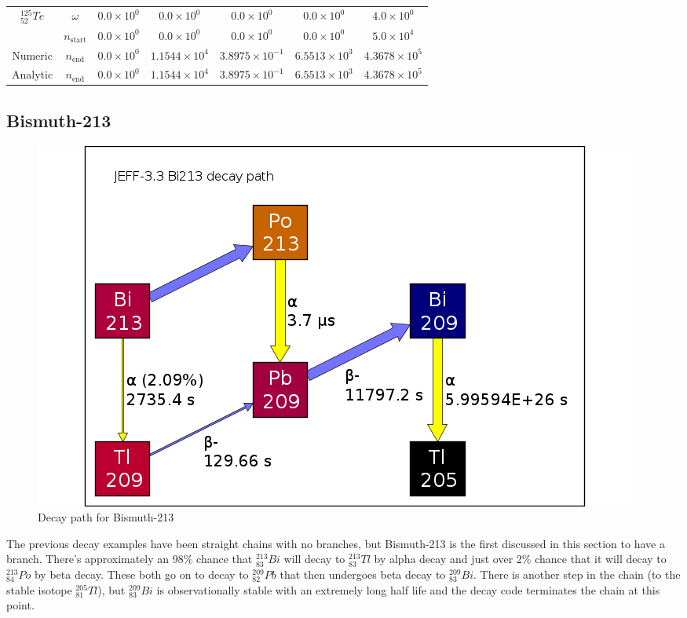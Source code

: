 \begin{table}[h]
\begin{center}
\begin{longtable}{c c c c c c c}
\hline
${}^{125}_{52}Te$ & $\omega$ & 
${0.0} \times 10^{0}$ & ${0.0} \times 10^{0}$ & ${0.0} \times 10^{0}$ &
${0.0} \times 10^{0}$ & ${4.0} \times 10^{0}$ \\
 & $n_{\text{start}}$ & 
${0.0} \times 10^{0}$ & ${0.0} \times 10^{0}$ & ${0.0} \times 10^{0}$ &
${0.0} \times 10^{0}$ & ${5.0} \times 10^{4}$ \\
Numeric & $n_{\text{end}}$ & 
${0.0} \times 10^{0}$ & ${1.1544} \times 10^{4}$ & ${3.8975} \times 10^{-1}$ & 
${6.5513} \times 10^{3}$ & ${4.3678} \times 10^{5}$ \\
Analytic & $n_{\text{end}}$ & 
${0.0} \times 10^{0}$ & ${1.1544} \times 10^{4}$ & ${3.8975} \times 10^{-1}$ & 
${6.5513} \times 10^{3}$ & ${4.3678} \times 10^{5}$ \\
\hline\hline
\end{longtable}
\end{center}
\caption{}
\label{table:cs125trialdata}
\end{table}


\clearpage
\subsection{Bismuth-213}
\FloatBarrier

\begin{figure}[!h]
\centering
		\includegraphics[width=.4\linewidth]{appendix/activity_equation/decay_paths/83bi213_decay.png}
		\caption{Decay path for Bismuth-213 \cite{jeff311}}
		\label{fig:decaybi213}
\end{figure}
\FloatBarrier

The previous decay examples have been straight chains with no branches, but Bismuth-213 is the first discussed in this section to have a branch.  There's approximately an 98\% chance that ${}^{213}_{83}Bi$ will decay to ${}^{213}_{83}Tl$ by alpha decay and just over 2\% chance that it will decay to ${}^{213}_{84}Po$ by beta decay.  These both go on to decay to ${}^{209}_{82}Pb$ that then undergoes beta decay to ${}^{209}_{83}Bi$.  There is another step in the chain (to the stable isotope ${}^{205}_{81}Tl$), but ${}^{209}_{83}Bi$ is observationally stable with an extremely long half life and the decay code terminates the chain at this point.

